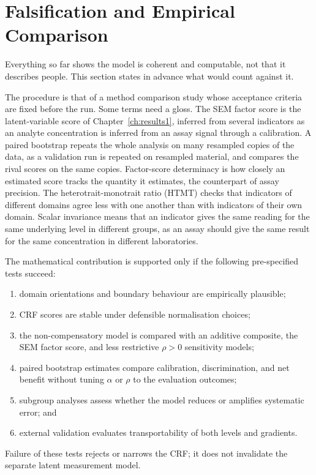 \section{Falsification and Empirical Comparison}
\label{sec:E-falsification}
Everything so far shows the model is coherent and computable, not that it
describes people. This section states in advance what would count against it.

The procedure is that of a method comparison study whose acceptance criteria
are fixed before the run. Some terms need a gloss. The SEM factor score is the
latent-variable score of Chapter~\ref{ch:results1}, inferred from several
indicators as an analyte concentration is inferred from an assay signal through
a calibration. A paired bootstrap repeats the whole analysis on many resampled
copies of the data, as a validation run is repeated on resampled material, and
compares the rival scores on the same copies. Factor-score determinacy is how
closely an estimated score tracks the quantity it estimates, the counterpart of
assay precision. The heterotrait-monotrait ratio (HTMT) checks that indicators
of different domains agree less with one another than with indicators of their
own domain. Scalar invariance means that an indicator gives the same reading for
the same underlying level in different groups, as an assay should give the same
result for the same concentration in different laboratories.

The mathematical contribution is supported only if the following pre-specified
tests succeed:
\begin{enumerate}
 \item domain orientations and boundary behaviour are empirically plausible;
 \item CRF scores are stable under defensible normalisation choices;
 \item the non-compensatory model is compared with an additive composite, the SEM
 factor score, and less restrictive $\rho>0$ sensitivity models;
 \item paired bootstrap \citep{efron_tibshirani_1993,steyerberg_2019} estimates compare calibration, discrimination, and net
 benefit without tuning $\alpha$ or $\rho$ to the evaluation outcomes;
 \item subgroup analyses assess whether the model reduces or amplifies systematic
 error; and
 \item external validation evaluates transportability of both levels and gradients.
\end{enumerate}
Failure of these tests rejects or narrows the CRF; it does not invalidate the
separate latent measurement model.

